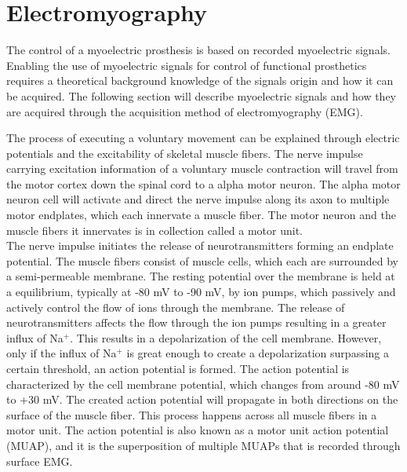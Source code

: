 \section{Electromyography}

The control of a myoelectric prosthesis is based on recorded myoelectric signals. \cite{Geethanjali2016}  Enabling the use of myoelectric signals for control of functional prosthetics requires a theoretical background knowledge of the signals origin and how it can be acquired. The following section will describe myoelectric signals and how they are acquired through the acquisition method of electromyography (EMG).      
 
The process of executing a voluntary movement can be explained through electric potentials and the excitability of skeletal muscle fibers. The nerve impulse carrying excitation information of a voluntary muscle contraction will travel from the motor cortex down the spinal cord to a alpha motor neuron. The alpha motor neuron cell will activate and direct the nerve impulse along its axon to multiple motor endplates, which each innervate a muscle fiber. The motor neuron and the muscle fibers it innervates is in collection called a motor unit. \cite{Turker2013} \\
The nerve impulse initiates the release of neurotransmitters forming an endplate potential. The muscle fibers consist of muscle cells, which each are surrounded by a semi-permeable membrane. The resting potential over the membrane is held at a equilibrium, typically at -80 mV to -90 mV, by ion pumps, which passively and actively control the flow of ions through the membrane. The release of neurotransmitters affects the flow through the ion pumps resulting in a greater influx of Na$^+$. This results in a depolarization of the cell membrane. However, only if the influx of Na$^+$ is great enough to create a depolarization surpassing a certain threshold, an action potential is formed. The action potential is characterized by the cell membrane potential, which changes from around -80 mV to +30 mV. %
The created action potential will propagate in both directions on the surface of the muscle fiber. This process happens across all muscle fibers in a motor unit. The action potential is also known as a motor unit action potential (MUAP), and it is the superposition of multiple MUAPs that is recorded through surface EMG. \cite{Turker2013,Martini2012} \\
